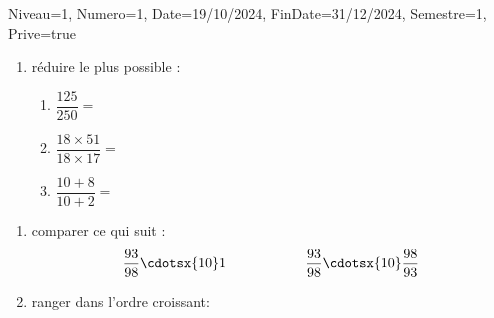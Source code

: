 \documentclass[a4paper,12pt]{article}
\begin{document}
\begin{Maquette}[DM]{Niveau=1, Numero=1, Date=19/10/2024, FinDate=31/12/2024, Semestre=1, Prive=true}
\begin{exercice}
\begin{enumerate}[font=\bfseries]
		\item réduire le plus possible :
\begin{enumerate}[label={\alph* =}]
\item $\dfrac{125}{250}=$\anserline[1]
\item $\dfrac{18\times 51}{18 \times 17}=$\anserline[1]
\item $\dfrac{10+8}{10+2}=$\anserline[1]
\end{enumerate}
\end{enumerate}		
\end{exercice}

\begin{exercice}
\begin{enumerate}[font=\bfseries]
		\item comparer ce qui suit  :	
$$\dfrac{93}{98}\cdotsx{10} 1 \hspace{1cm}   \hspace{1cm}
\dfrac{93}{98}\cdotsx{10}\dfrac{98}{93}$$

\item ranger dans l'ordre croissant:
\end{enumerate}

\end{exercice}

\end{Maquette}
\end{document}
